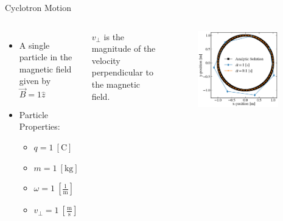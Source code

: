 \documentclass[aspectratio=169, 16pt]{beamer}
\newcommand{\unit}[1]{
    \: \left[ \text{#1} \right]
}
\newcommand{\fracunit}[2]{
    \: \left[
    \frac{\text{#1}}{\text{#2}}
    \right]
}
\begin{document}
\begin{frame}{Cyclotron Motion}
  \vfill{}
  \begin{columns}
    \centering
    \begin{itemize}
      \item A single particle in the magnetic field given by $\vec{B} = 1 \hat{z}$
      \item Particle Properties:
      \begin{itemize}
        \item $q = 1 \unit{C}$
        \item $m  = 1 \unit{kg}$ 
        \item $\omega = 1 \fracunit{1}{m}$
        \item $v_\perp = 1 \fracunit{m}{s}$
      \end{itemize}
    \end{itemize}
    $v_\perp$ is the magnitude of the velocity perpendicular to the magnetic field.
      \begin{figure}[H]
        \includegraphics[width=0.9\textwidth]{figs/cyclotron.png}
      \end{figure}
  \end{columns}
\end{frame}
\end{document}
